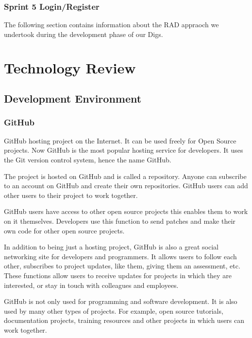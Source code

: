 \subsection{Sprint 5 Login/Register}

\noindent The following section contains information about the RAD appraoch we undertook during the development phase of our Digs.

\chapter{Technology Review}

\section{Development Environment}

\subsection{GitHub}
GitHub hosting project on the Internet. It can be used freely for Open Source projects. Now GitHub is the most popular hosting service for developers. It uses the Git version control system, hence the name GitHub.\par

The project is hosted on GitHub and is called a repository. Anyone can subscribe to an account on GitHub and create their own repositories. GitHub users can add other users to their project to work together.\par

GitHub users have access to other open source projects this enables them to work on it themselves. Developers use this function to send patches and make their own code for other open source projects.\par 

In addition to being just a hosting project, GitHub is also a great social networking site for developers and programmers. It allows users to follow each other, subscribes to project updates, like them, giving them an assessment, etc. These functions allow users to receive updates for projects in which they are interested, or stay in touch with colleagues and employees.\par

GitHub is not only used for programming and software development. It is also used by many other types of projects. For example, open source tutorials, documentation projects, training resources and other projects in which users can work together.\cite{GitHub}\par

